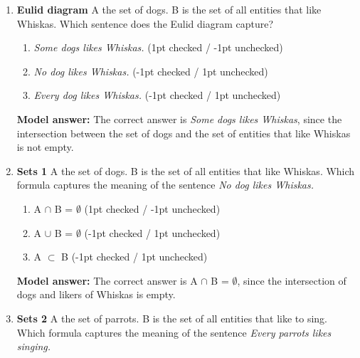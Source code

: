 \documentclass[a4,11pt]{article}
\begin{document}
\begin{enumerate}[leftmargin = 12pt]

\item {\bf Eulid diagram} A  the set of dogs. B is the set of all entities that like Whiskas. Which sentence does the Eulid diagram capture?


      \begin{enumerate}[noitemsep]
        \item \textit{Some dogs likes Whiskas.} (1pt checked / -1pt unchecked)
	\item \textit{No dog likes Whiskas.} (-1pt checked / 1pt unchecked)
        \item \textit{Every dog likes Whiskas.} (-1pt checked / 1pt unchecked)
	\end{enumerate}	

{\bf Model answer:}  The correct answer is \textit{Some dogs likes Whiskas}, since the intersection between the set of dogs and the set of entities that like Whiskas is not empty.


\item {\bf Sets 1} A  the set of dogs. B is the set of all entities that like Whiskas. Which formula captures the meaning of the sentence \textit{No dog likes Whiskas.}

      \begin{enumerate}[noitemsep]
        \item A $\cap$ B = $\emptyset$ (1pt checked / -1pt unchecked)
	\item A $\cup$ B = $\emptyset$  (-1pt checked / 1pt unchecked)
        \item A $\subset$ B (-1pt checked / 1pt unchecked)
	\end{enumerate}	
	
{\bf Model answer:}  The correct answer is  A $\cap$ B = $\emptyset$, since the intersection of dogs and likers of Whiskas is empty. 


\item {\bf Sets 2} A  the set of parrots. B is the set of all entities that like to sing. Which formula captures the meaning of the sentence \textit{Every parrots likes singing.}


\end{enumerate}
\end{document}
